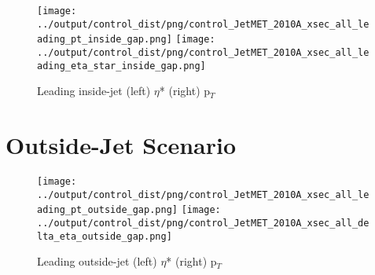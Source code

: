 \documentclass[11pt]{article}
\begin{document}
\begin{figure}[ht]
\centering
\texttt{[image: ../output/control\_dist/png/control\_JetMET\_2010A\_xsec\_all\_leading\_pt\_inside\_gap.png]}
\texttt{[image: ../output/control\_dist/png/control\_JetMET\_2010A\_xsec\_all\_leading\_eta\_star\_inside\_gap.png]}
\caption{Leading inside-jet (left) $\eta$* (right) p$_{T}$ }
\label{fig:leading_inside}
\end{figure}

\clearpage


\section{Outside-Jet Scenario}

\begin{figure}[ht]
\centering
\texttt{[image: ../output/control\_dist/png/control\_JetMET\_2010A\_xsec\_all\_leading\_pt\_outside\_gap.png]}
\texttt{[image: ../output/control\_dist/png/control\_JetMET\_2010A\_xsec\_all\_delta\_eta\_outside\_gap.png]}
\caption{Leading outside-jet (left) $\eta$* (right) p$_{T}$ }
\label{fig:leading_outside}
\end{figure}

 
\end{document}

